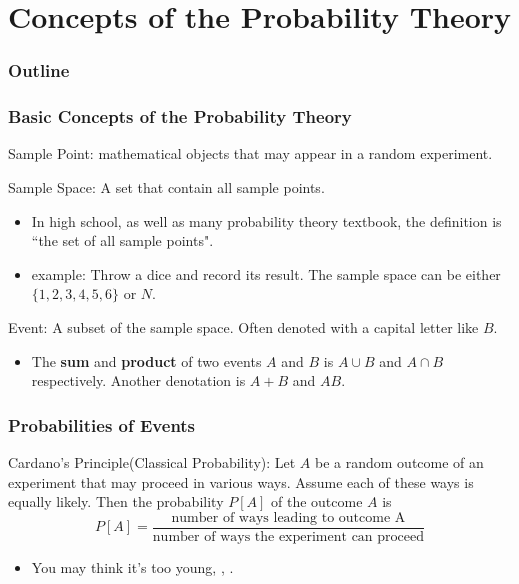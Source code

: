 \documentclass{beamer}
\begin{document}
\section{Concepts of the Probability Theory}
\begin{frame}
    \frametitle{Outline}
    \tableofcontents[currentsection]
\end{frame}

\begin{frame}
    \frametitle{Basic Concepts of the Probability Theory}
    Sample Point: mathematical objects that may appear in a random experiment.\par
    \vspace{0.3cm}
    Sample Space: A set that contain all sample points.
    \begin{itemize}
        \item In high school, as well as many probability theory textbook, the definition is ``the set of all sample points".
        \item example: Throw a dice and record its result. The sample space can be either $\{1,2,3,4,5,6\}$ or $N$.
    \end{itemize}
    Event: A subset of the sample space. Often denoted with a capital letter like $B$.
    \begin{itemize}
        \item The \textbf{sum} and \textbf{product} of two events $A$ and $B$ is $A\cup B$ and $A\cap B$ respectively. Another denotation is $A+B$ and $AB$.
    \end{itemize}

\end{frame}

\begin{frame}
    \frametitle{Probabilities of Events}
    Cardano's Principle(Classical Probability): Let $A$ be a random outcome of an experiment
    that may proceed in various ways. Assume each of these ways is equally likely. Then the probability $P[A]$ of the outcome $A$ is
    \[P[A]=\frac{\text{number of ways leading to outcome A}}{\text{number of ways the experiment can proceed}}\]
    \begin{itemize}
        \item You may think it's too young, \underline{\hspace{2cm}}, \underline{\hspace{2cm}}.
    \end{itemize}
\end{frame}
\end{document}
